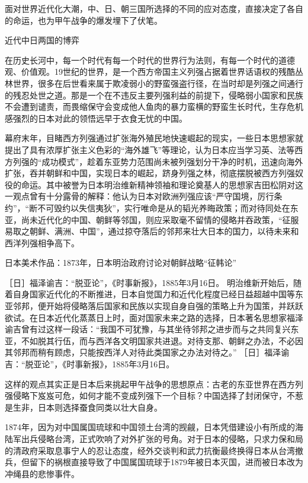 \documentclass[12pt,UTF8]{ctexbook}
\begin{document}
面对世界近代化大潮，中、日、朝三国所选择的不同的应对态度，直接决定了各自的命运，也为甲午战争的爆发埋下了伏笔。

近代中日两国的博弈

在历史长河中，每一个时代有每一个时代的世界行为法则，有每一个时代的道德观、价值观。19世纪的世界，是一个西方帝国主义列强占据着世界话语权的残酷丛林世界，很多在后世看来属于欺凌弱小的野蛮强盗行径，在当时却是列强之间通行的残忍处世之道。那是一个在不违反主要列强利益的前提下，侵略弱小国家和民族不会遭到谴责，而畏缩保守会变成他人鱼肉的暴力蛮横的野蛮生长时代，生存危机感强烈的日本对此的领悟远早于衣食无忧的中国。

幕府末年，目睹西方列强通过扩张海外殖民地快速崛起的现实，一些日本思想家就提出了具有浓厚扩张主义色彩的“海外雄飞”等理论，认为日本应当学习英、法等西方列强的“成功模式”，趁着东亚势力范围尚未被列强划分干净的时机，迅速向海外扩张，吞并朝鲜和中国，实现日本的崛起，跻身列强之林，彻底摆脱被西方列强奴役的命运。其中被誉为日本明治维新精神领袖和理论奠基人的思想家吉田松阴对这一观点曾有十分露骨的解释：他认为日本对欧洲列强应该“严守国境，厉行条约”，“断不可毁约以失信夷狄”，实行唯命是从的韬光养晦政策；而对待同处在东亚，尚未近代化的中国、朝鲜等邻国，则应采取毫不留情的侵略并吞政策，“征服易取之朝鲜、满洲、中国”，通过掠夺落后的邻邦来壮大日本的国力，以待未来和西洋列强相争高下。


日本美术作品：1873年，日本明治政府讨论对朝鲜战略“征韩论”

［日］福泽谕吉：“脱亚论”，《时事新报》，1885年3月16日。
明治维新开始后，随着自身国家近代化的不断推进，日本自觉国力和近代化程度已经日益超越中国等东亚邻邦，便开始将侵略落后国家和民族以实现自身自强的策略上升为国策，并跃跃欲试。在日本近代化蒸蒸日上时，面对国家未来之路的选择，日本著名思想家福泽谕吉曾有过这样一段话：“我国不可犹豫，与其坐待邻邦之进步而与之共同复兴东亚，不如脱其行伍，而与西洋各文明国家共进退。对待支那、朝鲜之办法，不必因其邻邦而稍有顾虑，只能按西洋人对待此类国家之办法对待之。” ［日］福泽谕吉：“脱亚论”，《时事新报》，1885年3月16日。

这样的观点其实正是日本后来挑起甲午战争的思想原点：古老的东亚世界在西方列强侵略下岌岌可危，如何才能不变成列强下一个目标？中国选择了封闭保守，不惹是生非，日本则选择蚕食同类以壮大自身。

1874年，因为对中国属国琉球和中国领土台湾的觊觎，日本凭借建设小有所成的海陆军出兵侵略台湾，正式吹响了对外扩张的号角。对于日本的侵略，只求力保和局的清政府采取息事宁人的忍让态度，经外交谈判和武力抗衡最终换得日本从台湾撤兵，但留下的祸根直接导致了中国属国琉球于1879年被日本灭国，进而被日本改为冲绳县的悲惨事件。
\end{document}
